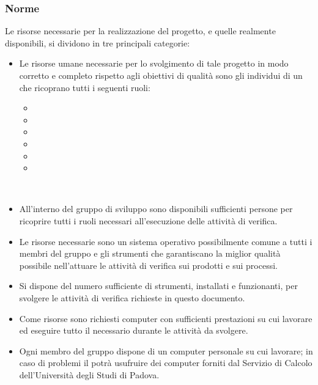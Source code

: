 \documentclass[a4paper, titlepage]{article}
\begin{document}
\subsubsection{Norme}

Le risorse necessarie per la realizzazione del progetto, e quelle realmente disponibili, si dividono in tre principali categorie:
\begin{itemize}
	\item {}
	\newline Le risorse umane necessarie per lo svolgimento di tale progetto in modo corretto e completo rispetto agli obiettivi di qualità sono gli individui di un  che ricoprano tutti i seguenti ruoli:
	\begin{itemize}
		\item {}
		\item {}
		\item {}
		\item {}
		\item {}
		\item {}
	\end{itemize}
	\ 
	\item {}
	\newline All'interno del gruppo di sviluppo sono disponibili sufficienti persone per ricoprire tutti i ruoli necessari all'esecuzione delle attività di verifica.
\end{itemize}

\begin{itemize}
	\item {}
	\newline Le risorse  necessarie sono un sistema operativo possibilmente comune a tutti i membri del gruppo e gli strumenti che garantiscano la miglior qualità possibile nell'attuare le attività di verifica sui prodotti e sui processi. 
	\ 
	\item \bold{Disponibili}
	\newline  Si dispone del numero sufficiente di strumenti, installati e funzionanti, per svolgere le attività di verifica richieste in questo documento.
\end{itemize}

\begin{itemize}
	\item {}
	\newline Come risorse  sono richiesti computer con sufficienti prestazioni su cui lavorare ed eseguire tutto il  necessario durante le attività da svolgere.
	\ 
	\item {}
	\newline Ogni membro del gruppo dispone di un computer personale su cui lavorare; in caso di problemi il \gl{team} potrà usufruire dei computer forniti dal Servizio di Calcolo dell’Università degli Studi di Padova.
\end{itemize}
\end{document}
